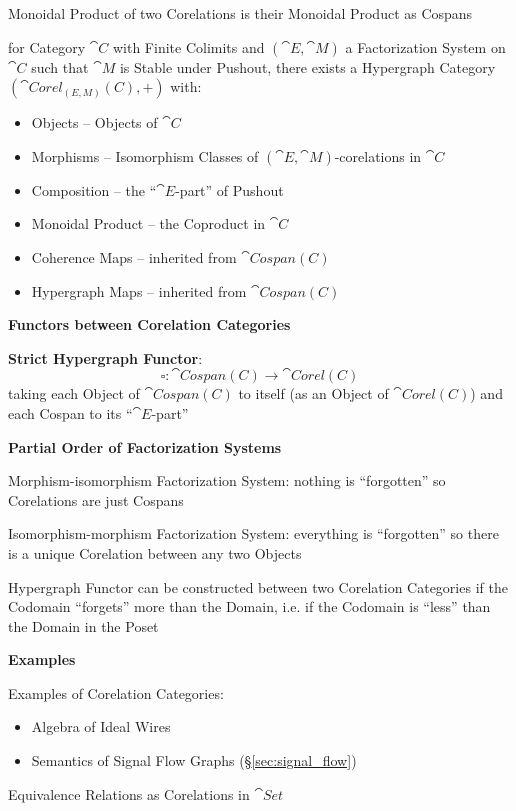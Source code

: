 Monoidal Product of two Corelations is their Monoidal Product as
Cospans

for Category $\cat{C}$ with Finite Colimits and $(\cat{E},\cat{M})$ a
Factorization System on $\cat{C}$ such that $\cat{M}$ is Stable under
Pushout, there exists a Hypergraph Category $(\cat{Corel_{(E,M)}(C)},
+)$ with:
\begin{itemize}
  \item Objects -- Objects of $\cat{C}$
  \item Morphisms -- Isomorphism Classes of
    $(\cat{E},\cat{M})$-corelations in $\cat{C}$
  \item Composition -- the ``$\cat{E}$-part'' of Pushout %
  \item Monoidal Product -- the Coproduct in $\cat{C}$
  \item Coherence Maps -- inherited from $\cat{Cospan(C)}$
  \item Hypergraph Maps -- inherited from $\cat{Cospan(C)}$
\end{itemize}


\textbf{Functors between Corelation Categories}


\textbf{Strict Hypergraph Functor}:
\[
  \square : \cat{Cospan(C)} \rightarrow \cat{Corel(C)}
\]
taking each Object of $\cat{Cospan(C)}$ to itself (as an Object of
$\cat{Corel(C)}$) and each Cospan to its ``$\cat{E}$-part''


\textbf{Partial Order of Factorization Systems} %

Morphism-isomorphism Factorization System: nothing is ``forgotten'' so
Corelations are just Cospans

Isomorphism-morphism Factorization System: everything is ``forgotten''
so there is a unique Corelation between any two Objects

Hypergraph Functor can be constructed between two Corelation
Categories if the Codomain ``forgets'' more than the Domain, i.e. if
the Codomain is ``less'' than the Domain in the Poset


\textbf{Examples}

Examples of Corelation Categories:
\begin{itemize}
  \item Algebra of Ideal Wires
  \item Semantics of Signal Flow Graphs (\S\ref{sec:signal_flow})
\end{itemize}

Equivalence Relations as Corelations in $\cat{Set}$ %

